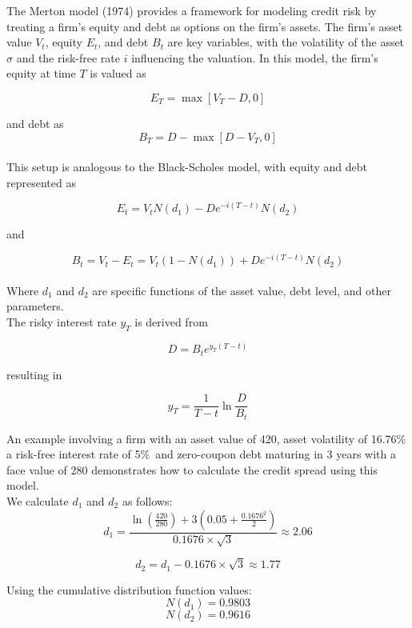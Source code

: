 \documentclass[a4paper,10pt]{article}
\begin{document}
\noindent The Merton model (1974) provides a framework for modeling credit risk by treating a firm's equity and debt as options on the firm's assets. The firm's asset value \( V_t \), equity \( E_t \), and debt \( B_t \) are key variables, with the volatility of the asset \( \sigma \) and the risk-free rate \( i \) influencing the valuation. In this model, the firm's equity at time \( T \) is valued as \

\[E_T = \max[V_T - D, 0]\]

\noindent and debt as \
\[B_T = D - \max[D - V_T, 0]\]\\

\newpage \noindent This setup is analogous to the Black-Scholes model, with equity and debt represented as \

\[E_t = V_t N(d_1) - De^{-i(T-t)} N(d_2)\]

\noindent and \

\[B_t = V_t - E_t = V_t (1 - N(d_1)) + De^{-i(T-t)} N(d_2)\]\\

\noindent Where \( d_1 \) and \( d_2 \) are specific functions of the asset value, debt level, and other parameters. \\

\noindent The risky interest rate \( y_T \) is derived from \

\[D = B_t e^{y_T (T-t)}\]

\noindent resulting in \

\[y_T = \frac{1}{T - t} \ln \frac{D}{B_t}\]

\noindent An example involving a firm with an asset value of 420, asset volatility of 16.76\%\, a risk-free interest rate of 5\%\, and zero-coupon debt maturing in 3 years with a face value of 280 demonstrates how to calculate the credit spread using this model. \\


\noindent We calculate \( d_1 \) and \( d_2 \) as follows: \\

\[ d_1 = \frac{\ln\left(\frac{420}{280}\right) + 3\left(0.05 + \frac{0.1676^2}{2}\right)}{0.1676 \times \sqrt{3}} \approx 2.06 \]

\[ d_2 = d_1 - 0.1676 \times \sqrt{3} \approx 1.77 \]

\noindent Using the cumulative distribution function values: \\
\[ N(d_1) = 0.9803 \] 
\[ N(d_2) = 0.9616 \] \\
\end{document}
